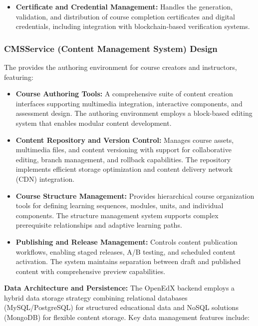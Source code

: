 \documentclass[../Main.tex]{subfiles}
\begin{document}
{{\begin{itemize}
		\item \textbf{Certificate and Credential Management:} Handles the generation,
			validation, and distribution of course completion certificates and digital
			credentials, including integration with blockchain-based verification systems.
	\end{itemize}

	\subsubsection{CMSService (Content Management System) Design}
	\label{section:4.2.2.2_cmservice_content_management_system_design} The
	 provides the authoring environment for course creators and
	instructors, featuring:

	\begin{itemize}
		\item \textbf{Course Authoring Tools:} A comprehensive suite of content
			creation interfaces supporting multimedia integration, interactive components,
			and assessment design. The authoring environment employs a block-based editing
			system that enables modular content development.

		\item \textbf{Content Repository and Version Control:} Manages course assets,
			multimedia files, and content versioning with support for collaborative
			editing, branch management, and rollback capabilities. The repository implements
			efficient storage optimization and content delivery network (CDN) integration.

		\item \textbf{Course Structure Management:} Provides hierarchical course
			organization tools for defining learning sequences, modules, units, and individual
			components. The structure management system supports complex prerequisite
			relationships and adaptive learning paths.

		\item \textbf{Publishing and Release Management:} Controls content
			publication workflows, enabling staged releases, A/B testing, and scheduled
			content activation. The system maintains separation between draft and
			published content with comprehensive preview capabilities.
	\end{itemize}

	\textbf{Data Architecture and Persistence:} The OpenEdX backend employs a hybrid
	data storage strategy combining relational databases (MySQL/PostgreSQL) for structured
	educational data and NoSQL solutions (MongoDB) for flexible content storage.
	Key data management features include:

}}
\end{document}

